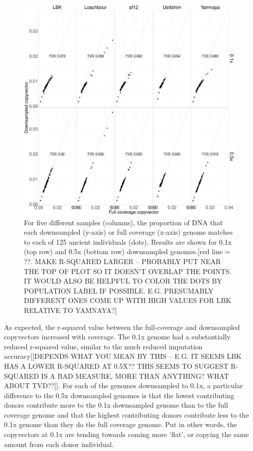 \begin{figure}[htp]
    \centering
    \includegraphics[width=1.0\textwidth]{../images/chapter1/CP_correlation_allSamples_0.1x_0.5x_30x.pdf}
    \caption{For five different samples (columns), the proportion of DNA that each downsampled (y-axis) or full coverage (x-axis) genome matches to each of 125 ancient individuals (dots). Results are shown for 0.1x (top row) and 0.5x (bottom row) downsampled genomes.{\color{red}[red line = ??. MAKE R-SQUARED LARGER -- PROBABLY PUT NEAR THE TOP OF PLOT SO IT DOESN'T OVERLAP THE POINTS. IT WOULD ALSO BE HELPFUL TO COLOR THE DOTS BY POPULATION LABEL IF POSSIBLE. E.G. PRESUMABLY DIFFERENT ONES COME UP WITH HIGH VALUES FOR LBK RELATIVE TO YAMNAYA?]}}
    \label{fig:CP_correlation_allSamples_0.1x_0.5x_30x}
\end{figure}

As expected, the r-squared value between the full-coverage and downsampled copyvectors increased with coverage. The 0.1x genome had a substantially reduced r-squared value, similar to the much reduced imputation accuracy[{\color{red}[DEPENDS WHAT YOU MEAN BY THIS -- E.G. IT SEEMS LBK HAS A LOWER R-SQUARED AT 0.5X?? THIS SEEMS TO SUGGEST R-SQUARED IS A BAD MEASURE, MORE THAN ANYTHING? WHAT ABOUT TVD??]}]. For each of the genomes downsampled to 0.1x, a particular difference to the 0.5x downsampled genomes is that the lowest contributing donors contribute more to the 0.1x downsampled genome than to the full coverage genome and that the highest contributing donors contribute less to the 0.1x genome than they do the full coverage genome. Put in other words, the copyvectors at 0.1x are tending towards coming more 'flat', or copying the same amount from each donor individual. 

